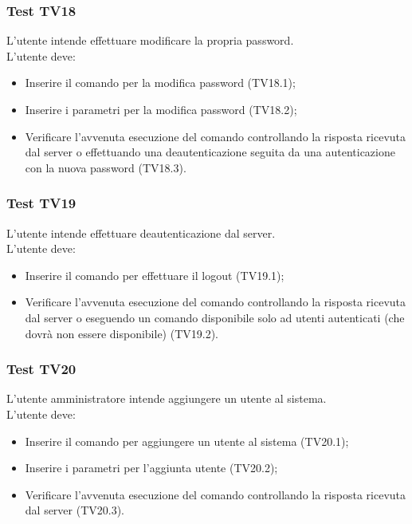 \documentclass{scalatekids-article}
\begin{document}
\subsubsection{Test TV18}

L'utente intende effettuare modificare la propria password.\\
L'utente deve:
\begin{itemize}
\item Inserire il comando per la modifica password (TV18.1);
\item Inserire i parametri per la modifica password (TV18.2);
\item Verificare l'avvenuta esecuzione del comando controllando la risposta ricevuta dal server o effettuando una deautenticazione seguita da una autenticazione con la nuova password (TV18.3).
\end{itemize}

\subsubsection{Test TV19}

L'utente intende effettuare deautenticazione dal server.\\
L'utente deve:
\begin{itemize}
\item Inserire il comando per effettuare il logout (TV19.1);
\item Verificare l'avvenuta esecuzione del comando controllando la risposta ricevuta dal server o eseguendo un comando disponibile solo ad utenti autenticati (che dovrà non essere disponibile) (TV19.2).
\end{itemize}

\subsubsection{Test TV20}

L'utente amministratore intende aggiungere un utente al sistema.\\
L'utente deve:
\begin{itemize}
\item Inserire il comando per aggiungere un utente al sistema (TV20.1);
\item Inserire i parametri per l'aggiunta utente (TV20.2);
\item Verificare l'avvenuta esecuzione del comando controllando la risposta ricevuta dal server (TV20.3).
\end{itemize}
\end{document}
